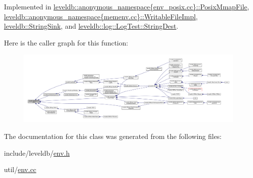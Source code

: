 Implemented in \hyperlink{classleveldb_1_1anonymous__namespace_02env__posix_8cc_03_1_1_posix_mmap_file_a48ab721906ed93aea1c9d1dd79ba0498}{leveldb\+::anonymous\+\_\+namespace\{env\+\_\+posix.\+cc\}\+::\+Posix\+Mmap\+File}, \hyperlink{classleveldb_1_1anonymous__namespace_02memenv_8cc_03_1_1_writable_file_impl_ad3b7274e119b56a2fc46a60fafc2df0b}{leveldb\+::anonymous\+\_\+namespace\{memenv.\+cc\}\+::\+Writable\+File\+Impl}, \hyperlink{classleveldb_1_1_string_sink_a77f1f2b9797737fbd89211ba0bb9a93e}{leveldb\+::\+String\+Sink}, and \hyperlink{classleveldb_1_1log_1_1_log_test_1_1_string_dest_a62d1a49e6d80f723dc28e8dca944b39a}{leveldb\+::log\+::\+Log\+Test\+::\+String\+Dest}.



Here is the caller graph for this function\+:
\nopagebreak
\begin{figure}[H]
\begin{center}
\leavevmode
\includegraphics[width=350pt]{classleveldb_1_1_writable_file_a2d2dcef02a2c9e71f3d39125bcd5a606_icgraph}
\end{center}
\end{figure}




The documentation for this class was generated from the following files\+:\begin{DoxyCompactItemize}
\item 
include/leveldb/\hyperlink{env_8h}{env.\+h}\item 
util/\hyperlink{env_8cc}{env.\+cc}\end{DoxyCompactItemize}
